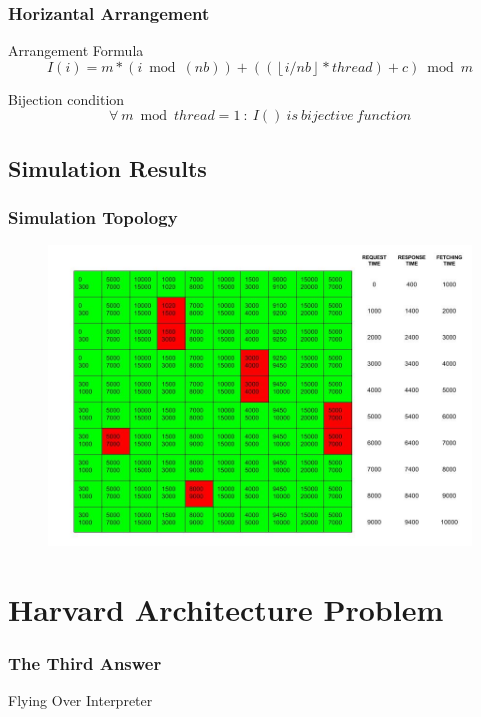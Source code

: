 \documentclass{beamer}
\begin{document}

\begin{frame}
	\frametitle{Horizantal Arrangement}
\begin{exampleblock}{Arrangement Formula}
\[
	I(i)=m*(i\bmod{(nb)})+((\left \lfloor i/nb \right \rfloor*thread)+c)\bmod{m}
\]
\end{exampleblock}
\begin{exampleblock}{Bijection condition}
\[
	\forall\: m\bmod thread = 1\ :\  I()\ is\ bijective\ function
\]
\end{exampleblock}
\end{frame}

\subsection{Simulation Results}
\begin{frame}[plain]
	\frametitle{Simulation Topology}
		\begin{figure}
			\includegraphics[width=1.1\linewidth]{img/overall_timing_attack.jpg}
		\end{figure}
\end{frame}


\section{Harvard Architecture Problem}
\begin{frame}
	\frametitle{The Third Answer}
	\huge{\centerline{Flying Over Interpreter}}
\end{frame}
\end{document}
